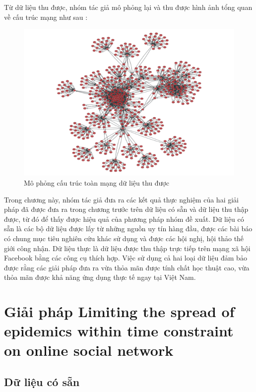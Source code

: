 \begin {itemize}
Từ dữ liệu thu được, nhóm tác giả mô phỏng lại và thu được hình ảnh tổng quan về cấu trúc mạng như sau :

\begin{center}
	\begin{figure}[htp]
		\begin{center}
			\includegraphics [scale=.5]{picture/Hinh3_2}
		\end{center}
		\caption{Mô phỏng cấu trúc toàn mạng dữ liệu thu được}
		\label{refhinh3_2}
	\end{figure}
\end{center}
\end {itemize}
Trong chương này, nhóm tác giả đưa ra các kết quả thực nghiệm của hai giải pháp đã được đưa ra trong chương trước trên dữ liệu có sẵn và dữ liệu thu thập được, từ đó để thấy được hiệu quả của phương pháp nhóm đề xuất. Dữ liệu có sẵn là các bộ dữ liệu được lấy từ những nguồn uy tín hàng đầu, được các bài báo có chung mục tiêu nghiên cứu khác sử dụng và được các hội nghị, hội thảo thế giới công nhận. Dữ liệu thực là dữ liệu được thu thập trực tiếp trên mạng xã hội Facebook bằng các công cụ thích hợp. Việc sử dụng cả hai loại dữ liệu đảm bảo được rằng các giải pháp đưa ra vừa thỏa mãn được tính chất học thuật cao, vừa thỏa mãn được khả năng ứng dụng thực tế ngay tại Việt Nam.

\section{Giải pháp Limiting the spread of epidemics within time constraint on online social network}
\subsection{Dữ liệu có sẵn}

